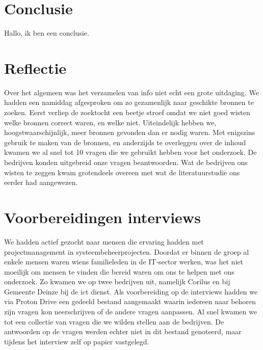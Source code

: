 \documentclass{article}
\begin{document}
    
    \section{Conclusie}
    
    Hallo, ik ben een conclusie.

    \newpage
    \printbibliography
    \section{Reflectie}
    Over het algemeen was het verzamelen van info niet echt een grote uitdaging. We hadden een namiddag afgesproken om zo gezamenlijk naar geschikte bronnen te zoeken. Eerst verliep de zoektocht een beetje stroef omdat we niet goed wisten welke bronnen correct waren, en welke niet. Uiteindelijk hebben we, hoogstwaarschijnlijk, meer bronnen gevonden dan er nodig waren. Met enigszins gebruik te maken van de bronnen, en anderzijds te overleggen over de inhoud kwamen we al snel tot 10 vragen die we gebruikt hebben voor het onderzoek. 
    De bedrijven konden uitgebreid onze vragen beantwoorden. Wat de bedrijven ons wisten te zeggen kwam grotendeels overeen met wat de literatuurstudie ons eerder had aangewezen.  
    \section{Voorbereidingen interviews}

    We hadden actief gezocht naar mensen die ervaring hadden met projectmanagement in systeembeheerprojecten.
    Doordat er binnen de groep al enkele mensen waren wiens familieleden in de IT-sector werken, was het niet moeilijk om mensen te vinden die bereid waren om ons te helpen met ons onderzoek.
    Zo kwamen we op twee bedrijven uit, namelijk Corilus en bij Gemeente Deinze bij de ict dienst. \newline
    Als voorbereiding op de interviews hadden we via Proton Drive een gedeeld bestand aangemaakt waarin iedereen naar behoren zijn vragen kon neerschrijven of de andere vragen aanpassen. 
    Al snel kwamen we tot een collectie van vragen die we wilden stellen aan de bedrijven.
    De antwoorden op de vragen werden echter niet in dit bestand genoteerd, maar tijdens het interview zelf op papier vastgelegd.
\end{document}
